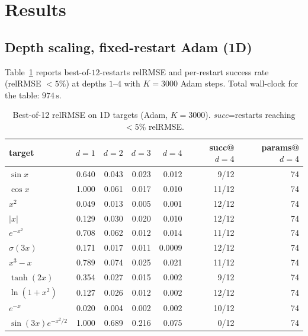 \documentclass[11pt]{article}
\begin{document}
\section{Results}

\subsection{Depth scaling, fixed-restart Adam (1D)}
\label{sec:depth-scaling}

Table~\ref{tab:1d} reports best-of-$12$-restarts relRMSE and per-restart
success rate (relRMSE $< 5\%$) at depths $1$--$4$ with $K = 3000$ Adam steps.
Total wall-clock for the table: $974\,\mathrm{s}$.

\begin{table}[h]
\centering
\small
\caption{Best-of-12 relRMSE on 1D targets (Adam, $K{=}3000$). \emph{succ}{=}restarts
reaching $<5\%$ relRMSE.}
\label{tab:1d}
\begin{tabular}{lrrrrrr}
\toprule
target               & $d{=}1$ & $d{=}2$ & $d{=}3$ & $d{=}4$ & succ@$d{=}4$ & params@$d{=}4$ \\
\midrule
$\sin x$             & 0.640   & 0.043   & 0.023   & 0.012   & 9/12  & 74 \\
$\cos x$             & 1.000   & 0.061   & 0.017   & 0.010   & 11/12 & 74 \\
$x^2$                & 0.049   & 0.013   & 0.005   & 0.001   & 12/12 & 74 \\
$|x|$                & 0.129   & 0.030   & 0.020   & 0.010   & 12/12 & 74 \\
$e^{-x^2}$           & 0.708   & 0.062   & 0.012   & 0.014   & 11/12 & 74 \\
$\sigma(3x)$         & 0.171   & 0.017   & 0.011   & 0.0009  & 12/12 & 74 \\
$x^3 - x$            & 0.789   & 0.074   & 0.025   & 0.021   & 11/12 & 74 \\
$\tanh(2x)$          & 0.354   & 0.027   & 0.015   & 0.002   & 9/12  & 74 \\
$\ln(1+x^2)$         & 0.127   & 0.026   & 0.012   & 0.002   & 12/12 & 74 \\
$e^{-x}$             & 0.020   & 0.004   & 0.002   & 0.002   & 10/12 & 74 \\
$\sin(3x) e^{-x^2/2}$ & 1.000  & 0.689   & 0.216   & 0.075   & 0/12  & 74 \\
\bottomrule
\end{tabular}
\end{table}
\end{document}
